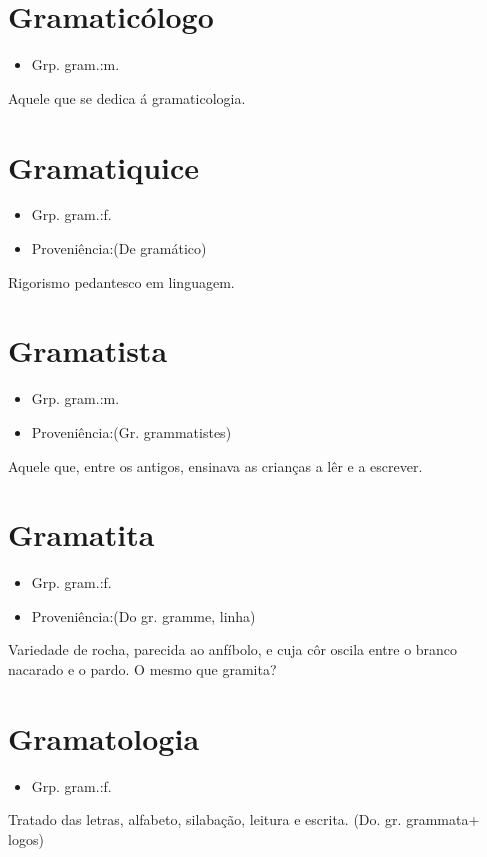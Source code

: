 \section{Gramaticólogo}
\begin{itemize}
\item {Grp. gram.:m.}
\end{itemize}
Aquele que se dedica á gramaticologia.
\section{Gramatiquice}
\begin{itemize}
\item {Grp. gram.:f.}
\end{itemize}
\begin{itemize}
\item {Proveniência:(De \textunderscore gramático\textunderscore )}
\end{itemize}
Rigorismo pedantesco em linguagem.
\section{Gramatista}
\begin{itemize}
\item {Grp. gram.:m.}
\end{itemize}
\begin{itemize}
\item {Proveniência:(Gr. \textunderscore grammatistes\textunderscore )}
\end{itemize}
Aquele que, entre os antigos, ensinava as crianças a lêr e a escrever.
\section{Gramatita}
\begin{itemize}
\item {Grp. gram.:f.}
\end{itemize}
\begin{itemize}
\item {Proveniência:(Do gr. \textunderscore gramme\textunderscore , linha)}
\end{itemize}
Variedade de rocha, parecida ao anfíbolo, e cuja côr oscila entre o branco nacarado e o pardo.
O mesmo que \textunderscore gramita\textunderscore ?
\section{Gramatologia}
\begin{itemize}
\item {Grp. gram.:f.}
\end{itemize}
Tratado das letras, alfabeto, silabação, leitura e escrita.
(Do. gr. \textunderscore grammata\textunderscore  + \textunderscore logos\textunderscore )
